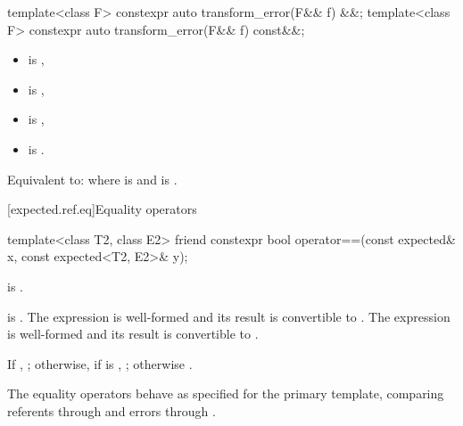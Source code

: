 %
\begin{itemdecl}
template<class F> constexpr auto transform_error(F&& f) &&;
template<class F> constexpr auto transform_error(F&& f) const&&;
\end{itemdecl}

\begin{itemdescr}
\pnum
\mandates
\begin{itemize}
\item {} is ,
\item {} is ,
\item {} is ,
\item {} is .
\end{itemize}

\pnum
\effects
Equivalent to:  where  is  and  is .
\end{itemdescr}

[expected.ref.eq]{Equality operators}

%
\begin{itemdecl}
template<class T2, class E2>
friend constexpr bool operator==(const expected& x, const expected<T2, E2>& y);
\end{itemdecl}

\begin{itemdescr}
\pnum
\constraints
{} is .

\pnum
\mandates
{} is . The expression  is well-formed and its result is convertible to . The expression  is well-formed and its result is convertible to .

\pnum
\returns
If , ; otherwise, if  is , ; otherwise .

\pnum
\remarks
The equality operators behave as specified for the primary template, comparing referents through  and errors through .
\end{itemdescr}

